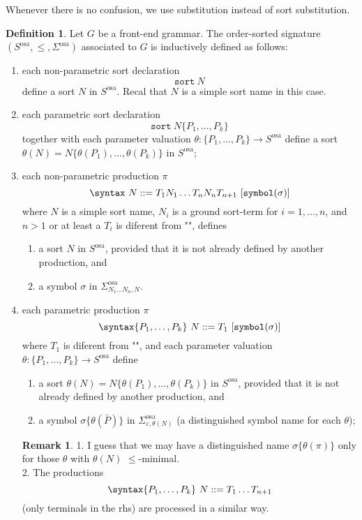 \documentclass{article}
\theoremstyle{definition}
\theoremstyle{definition}
\theoremstyle{definition}
\newtheorem{definition}{Definition}[section]
\theoremstyle{definition}
\newtheorem{remark}{Remark}[section]
\theoremstyle{theorem}
\theoremstyle{theorem}
\theoremstyle{theorem}
\theoremstyle{theorem}
\theoremstyle{theorem}
\newcommand{\KWsymbol}{\texttt{symbol}}
\newcommand{\sort}{\texttt{sort}}
\begin{document}
{Whenever there is no confusion, we use substitution instead of sort substitution.


\begin{definition}
Let $G$ be a front-end grammar. The order-sorted signature $(S^\textrm{osa},\le, \Sigma^\textrm{osa})$ associated to $G$ is inductively defined as follows:
\begin{enumerate}
\item each non-parametric sort declaration
\[\sort\ N\] 
define a sort $N$ in $S^\textrm{osa}$. Recal that $N$ is a simple sort name in this case.
\item each parametric sort declaration
\[\sort\ N\{P_1,\ldots,P_k\}\]
together with each parameter valuation $\theta : \{P_1,\ldots,P_k\}\to S^\textrm{osa}$ 
define a sort $\theta(N)=N\{\theta(P_1),\ldots,\theta(P_k)\}$ in $S^\textrm{osa}$;
\item each non-parametric production $\pi$
\[\syntax\ N ::= T_1 N_1 \ldots T_n N_n T_{n+1}\ [\KWsymbol(\sigma)]\]
where $N$ is a simple sort name, $N_i$ is a ground sort-term for $i=1,\ldots,n$, and $n>1$  or at least a $T_i$ is diferent from "", defines
\begin{enumerate}
\item a sort $N$ in $S^\textrm{osa}$, provided that it is not already defined by another production, and
\item a symbol $\sigma$ in $\Sigma^\textrm{osa}_{N_1\ldots N_n,N}$.
\end{enumerate}
\item each parametric production $\pi$
\[\syntax\{P_1,\ldots,P_k\}\ N ::= T_1\ [\KWsymbol(\sigma)] \]
where $T_1$ is diferent from "", and each parameter valuation
$\theta : \{P_1,\ldots,P_k\}\to S^\textrm{osa}$ define
\begin{enumerate}
\item a sort $\theta(N)=N\{\theta(P_1),\ldots,\theta(P_k)\}$ in $S^\textrm{osa}$, provided that it is not already defined by another production, and
\item a symbol $\sigma\{\theta(\bar{P})\}$ in $\Sigma^\textrm{osa}_{\varepsilon,\theta(N)}$ (a distinguished symbol name for each $\theta$);
\end{enumerate}
\begin{remark}
1.  I guess that we may have a distinguished name $\sigma\{\theta(\pi)\}$ only for those $\theta$ with $\theta(N)$ $\le$-minimal.\\
2. The productions 
\[\syntax\{P_1,\ldots,P_k\}\ N ::= T_1\ldots T_{n+1} \]
(only terminals in the rhs) are processed in a similar way.

\end{remark}
\end{enumerate}
\end{definition}}
\end{document}
